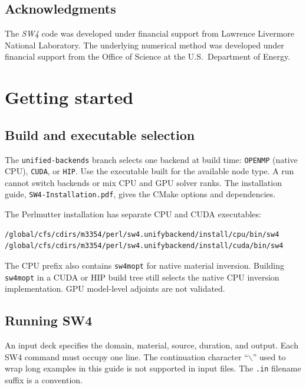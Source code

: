 \documentclass[11pt]{report}
\begin{document}
\section{Acknowledgments} 
The \emph{SW4} code was developed under financial support from Lawrence Livermore National
Laboratory. The underlying numerical method was developed under financial support from
the Office of Science at the U.S.~Department of Energy.


\chapter{Getting started}

\section{Build and executable selection}
The \texttt{unified-backends} branch selects one backend at build time:
\texttt{OPENMP} (native CPU), \texttt{CUDA}, or \texttt{HIP}.
Use the executable built for the available node type. A run cannot switch
backends or mix CPU and GPU solver ranks. The installation guide,
\texttt{SW4-Installation.pdf}, gives the CMake options and dependencies.

The Perlmutter installation has separate CPU and CUDA executables:
\begin{verbatim}
/global/cfs/cdirs/m3354/perl/sw4.unifybackend/install/cpu/bin/sw4
/global/cfs/cdirs/m3354/perl/sw4.unifybackend/install/cuda/bin/sw4
\end{verbatim}
The CPU prefix also contains \texttt{sw4mopt} for native material inversion.
Building \texttt{sw4mopt} in a CUDA or HIP build tree still selects the native
CPU inversion implementation. GPU model-level adjoints are not validated.

\section{Running SW4}
An input deck specifies the domain, material, source, duration, and output.
Each SW4 command must occupy one line. The continuation character
``$\backslash$'' used to wrap long examples in this guide is not supported
in input files. The \texttt{.in} filename suffix is a convention.
\end{document}
